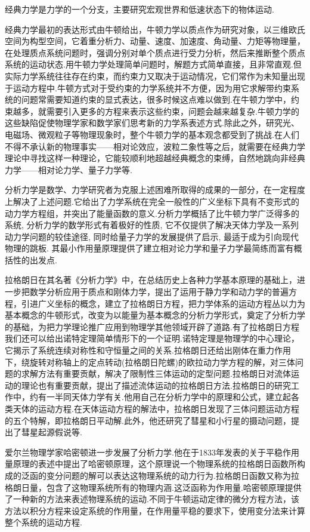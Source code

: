 \documentclass[UTF8,10.5pt,a4paper]{ctexart}
\numberwithin{equation}{section}
\theoremstyle{definition}
\theoremstyle{definition}
\begin{document}
经典力学是力学的一个分支，主要研究宏观世界和低速状态下的物体运动.
\par 经典力学最初的表达形式由牛顿给出，牛顿力学以质点作为研究对象，以三维欧氏空间为构型空间，它着重分析力、动量、速度、加速度、角动量、力矩等物理量，在处理质点系统问题时，强调分别对单个质点进行受力分析，然后来推断整个质点系统的运动状态.用牛顿力学处理简单问题时，解题方式简单直接，且非常直观.但实际力学系统往往存在约束，而约束力又取决于运动情况，它们常作为未知量出现于运动方程中.牛顿方式对于受约束的力学系统并不方便，因为用它求解带约束系统的问题常需要知道约束的显式表达，很多时候这点难以做到.在牛顿力学中，约束越多，就需要引入更多的方程来表示这些约束，问题会越来越复杂.牛顿力学的这些缺陷促使物理学家和数学家们思考新的力学系表述方式.除此之外，研究光、电磁场、微观粒子等物理现象时，整个牛顿力学的基本观念都受到了挑战.在人们不得不承认新的物理事实——相对论效应，波粒二象性等之后，就需要在经典力学理论中寻找这样一种理论，它能较顺利地超越经典概念的束缚，自然地跳向非经典力学——相对论力学、量子力学等.
\par 分析力学是数学、力学研究者为克服上述困难所取得的成果的一部分，在一定程度上解决了上述问题.它给出了力学系统在完全一般性的广义坐标下具有不变形式的动力学方程组，并突出了能量函数的意义.分析力学概括了比牛顿力学广泛得多的系统, 分析力学的数学形式有着极好的性质, 它不仅提供了解决天体力学及一系列动力学问题的较佳途径, 同时给量子力学的发展提供了启示, 最适于成为引向现代物理的跳板. 其最小作用量原理提供了建立相对论力学和量子力学最简练而富有概括性的出发点.
\par 拉格朗日在其名著《分析力学》中，在总结历史上各种力学基本原理的基础上，进一步把数学分析应用于质点和刚体力学，提出了运用于静力学和动力学的普遍方程，引进广义坐标的概念，建立了拉格朗日方程，把力学体系的运动方程丛以力为基本概念的牛顿形式，改变为以能量为基本概念的分析力学形式，奠定了分析力学的基础，为把力学理论推广应用到物理学其他领域开辟了道路.有了拉格朗日方程我们还可以给出诺特定理简单情形下的一个证明.诺特定理是物理学的中心理论，它揭示了系统连续对称性和守恒量之间的关系.拉格朗日还给出刚体在重力作用下，绕旋转对称轴上的定点转动(拉格朗日陀螺)的欧拉动力学方程的解，对三体问题的求解方法有重要贡献，解决了限制性三体运动的定型问题.拉格朗日对流体运动的理论也有重要贡献，提出了描述流体运动的拉格朗日方法.拉格朗日的研究工作中，约有一半同天体力学有关.他用自己在分析力学中的原理和公式，建立起各类天体的运动方程.在天体运动方程的解法中，拉格朗日发现了三体问题运动方程的五个特解，即拉格朗日平动解.此外，他还研究了彗星和小行星的摄动问题，提出了彗星起源假说等.
\par 爱尔兰物理学家哈密顿进一步发展了分析力学.他在于1833年发表的关于平稳作用量原理的表述中提出了哈密顿原理，这个原理说一个物理系统的拉格朗日函数所构成的泛函的变分问题的解可以表达这物理系统的动力行为.拉格朗日函数又称为拉格朗日量，包含了这物理系统所有的物理内涵.这泛函称为作用量.哈密顿原理提供了一种新的方法来表述物理系统的运动.不同于牛顿运动定律的微分方程方法，该方法以积分方程来设定系统的作用量，在作用量平稳的要求下，使用变分法来计算整个系统的运动方程.
\end{document}
